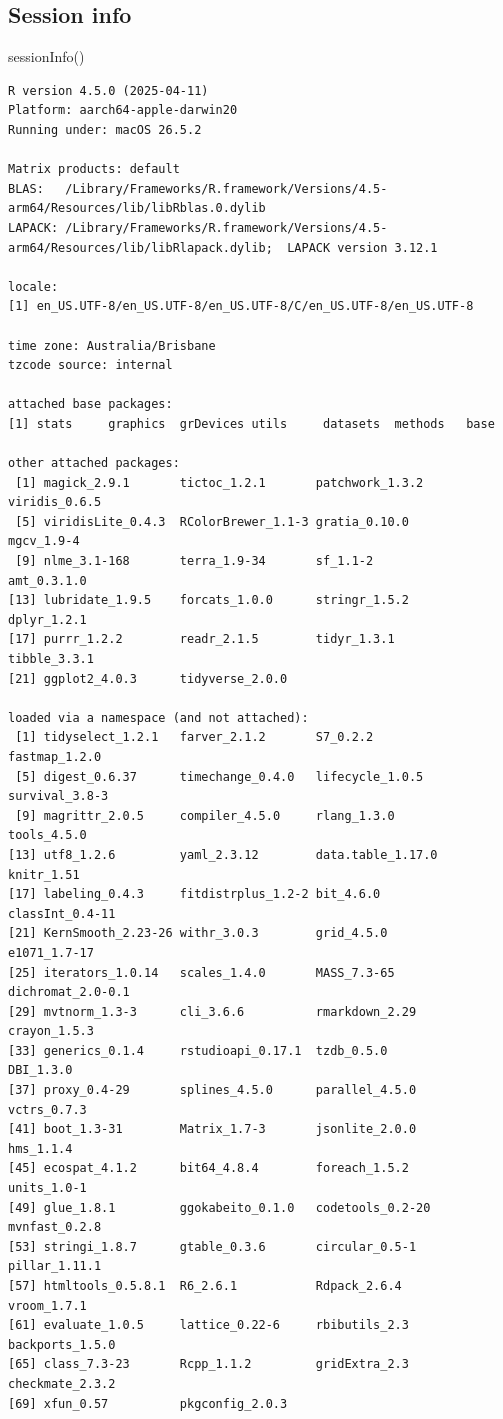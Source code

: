 \documentclass[
  letterpaper,
  DIV=11,
  numbers=noendperiod]{scrartcl}
\newenvironment{Shaded}{\begin{snugshade}}{\end{snugshade}}
\newcommand{\FunctionTok}[1]{\textcolor[rgb]{0.28,0.35,0.67}{#1}}
\newcommand{\NormalTok}[1]{\textcolor[rgb]{0.00,0.23,0.31}{#1}}
\begin{document}
\subsection{Session info}\label{session-info}

\begin{Shaded}
\begin{Highlighting}[]
\FunctionTok{sessionInfo}\NormalTok{()}
\end{Highlighting}
\end{Shaded}

\begin{verbatim}
R version 4.5.0 (2025-04-11)
Platform: aarch64-apple-darwin20
Running under: macOS 26.5.2

Matrix products: default
BLAS:   /Library/Frameworks/R.framework/Versions/4.5-arm64/Resources/lib/libRblas.0.dylib 
LAPACK: /Library/Frameworks/R.framework/Versions/4.5-arm64/Resources/lib/libRlapack.dylib;  LAPACK version 3.12.1

locale:
[1] en_US.UTF-8/en_US.UTF-8/en_US.UTF-8/C/en_US.UTF-8/en_US.UTF-8

time zone: Australia/Brisbane
tzcode source: internal

attached base packages:
[1] stats     graphics  grDevices utils     datasets  methods   base     

other attached packages:
 [1] magick_2.9.1       tictoc_1.2.1       patchwork_1.3.2    viridis_0.6.5     
 [5] viridisLite_0.4.3  RColorBrewer_1.1-3 gratia_0.10.0      mgcv_1.9-4        
 [9] nlme_3.1-168       terra_1.9-34       sf_1.1-2           amt_0.3.1.0       
[13] lubridate_1.9.5    forcats_1.0.0      stringr_1.5.2      dplyr_1.2.1       
[17] purrr_1.2.2        readr_2.1.5        tidyr_1.3.1        tibble_3.3.1      
[21] ggplot2_4.0.3      tidyverse_2.0.0   

loaded via a namespace (and not attached):
 [1] tidyselect_1.2.1   farver_2.1.2       S7_0.2.2           fastmap_1.2.0     
 [5] digest_0.6.37      timechange_0.4.0   lifecycle_1.0.5    survival_3.8-3    
 [9] magrittr_2.0.5     compiler_4.5.0     rlang_1.3.0        tools_4.5.0       
[13] utf8_1.2.6         yaml_2.3.12        data.table_1.17.0  knitr_1.51        
[17] labeling_0.4.3     fitdistrplus_1.2-2 bit_4.6.0          classInt_0.4-11   
[21] KernSmooth_2.23-26 withr_3.0.3        grid_4.5.0         e1071_1.7-17      
[25] iterators_1.0.14   scales_1.4.0       MASS_7.3-65        dichromat_2.0-0.1 
[29] mvtnorm_1.3-3      cli_3.6.6          rmarkdown_2.29     crayon_1.5.3      
[33] generics_0.1.4     rstudioapi_0.17.1  tzdb_0.5.0         DBI_1.3.0         
[37] proxy_0.4-29       splines_4.5.0      parallel_4.5.0     vctrs_0.7.3       
[41] boot_1.3-31        Matrix_1.7-3       jsonlite_2.0.0     hms_1.1.4         
[45] ecospat_4.1.2      bit64_4.8.4        foreach_1.5.2      units_1.0-1       
[49] glue_1.8.1         ggokabeito_0.1.0   codetools_0.2-20   mvnfast_0.2.8     
[53] stringi_1.8.7      gtable_0.3.6       circular_0.5-1     pillar_1.11.1     
[57] htmltools_0.5.8.1  R6_2.6.1           Rdpack_2.6.4       vroom_1.7.1       
[61] evaluate_1.0.5     lattice_0.22-6     rbibutils_2.3      backports_1.5.0   
[65] class_7.3-23       Rcpp_1.1.2         gridExtra_2.3      checkmate_2.3.2   
[69] xfun_0.57          pkgconfig_2.0.3   
\end{verbatim}
\end{document}
